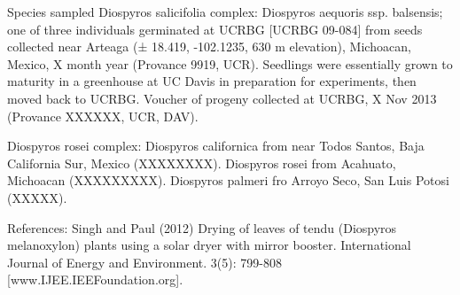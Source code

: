 \documentclass[]{article}
\begin{document}
Species sampled
Diospyros salicifolia complex:
Diospyros aequoris ssp. balsensis; one of three individuals germinated at UCRBG [UCRBG 09-084] from seeds collected near Arteaga (± 18.419, -102.1235, 630 m elevation), Michoacan, Mexico, X month year (Provance 9919, UCR). Seedlings were essentially grown to maturity in a greenhouse at UC Davis in preparation for experiments, then moved back to UCRBG. Voucher of progeny collected at UCRBG, X Nov 2013 (Provance XXXXXX, UCR, DAV).
 
Diospyros rosei complex:
Diospyros californica from near Todos Santos, Baja California Sur, Mexico (XXXXXXXX).
Diospyros rosei from Acahuato, Michoacan (XXXXXXXXX).
Diospyros palmeri fro Arroyo Seco, San Luis Potosi (XXXXX).
 
References:
Singh and Paul (2012) Drying of leaves of tendu (Diospyros melanoxylon) plants using a solar dryer with mirror booster. International Journal of Energy and Environment. 3(5): 799-808 [www.IJEE.IEEFoundation.org].
\end{document}
